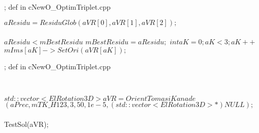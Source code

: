 \begin{algorithm}
\caption{; def in cNewO\_OptimTriplet.cpp  }
\begin{algorithmic}
\State 
\Comment {}
\State $aResidu = ResiduGlob(aVR[0],aVR[1],aVR[2]);$
\\
\\
\Comment {}
\If $aResidu < mBestResidu$
\State  $     mBestResidu = aResidu;$
\For       $int aK=0 ; aK<3 ; aK++$
\State           $mIms[aK]->SetOri(aVR[aK]);$
\EndFor
\EndIf

\end{algorithmic}\label{alg:Optim1TestSol}
\end{algorithm}

\begin{algorithm}
\caption{; def in cNewO\_OptimTriplet.cpp  }
\begin{algorithmic}
\State 
\\
\Comment {}

\State $std::vector<ElRotation3D> aVR = OrientTomasiKanade $ \\
                                    $(aPrec,mTK\_H123,3,50,1e-5,(std::vector<ElRotation3D> *)NULL);$
\\
\\
\Comment {}
\State TestSol(aVR);


\end{algorithmic}\label{alg:Optim1TestTK}
\end{algorithm}